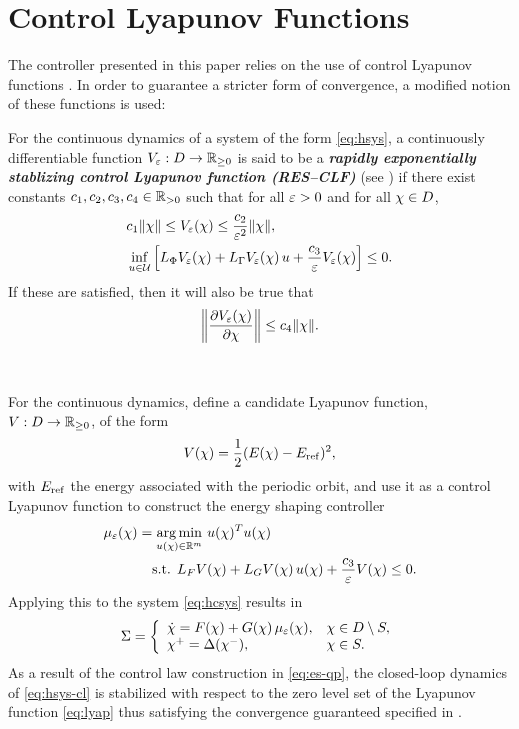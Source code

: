 \section{Control Lyapunov Functions}

The controller presented in this paper relies on the use of control Lyapunov functions \cite{Artstein83,FreeKoko}.
%
In order to guarantee a stricter form of convergence, a modified notion of these functions is used:\vgap

\begin{definition}
  \label{def:res-clf}
  For the continuous dynamics of a system of the form \eqref{eq:hsys}, a continuously differentiable function $V_{\varepsilon} : D \to \mathbb{R}_{\geq 0}$ is said to be a {\bf \em rapidly exponentially stablizing control Lyapunov function (RES--CLF)} (see \cite{AmGaSrGr14}) if there exist constants $c_{1}, c_{2}, c_{3}, c_{4} \in \mathbb{R}_{> 0}$ such that for all $\varepsilon > 0$ and for all $\chi \in D$,
  \begin{eqnarray}
    &c_{1} \|\chi\| \leq V_{\varepsilon}(\chi) \leq \frac{c_{2}}{\varepsilon^{2}} \|\chi\|,\\
    \nonumber
    &\inf_{u \in \mathcal{U}} \left[ L_{\Phi} V_{\varepsilon}(\chi) + L_{\Gamma} V_{\varepsilon}(\chi) \, u + \frac{c_{3}}{\varepsilon} V_{\varepsilon}(\chi) \right] \leq 0.
  \end{eqnarray}
  If these are satisfied, then it will also be true that
  \begin{align}
    \label{eq:dVedx-bounds}
    \left\| \frac{\partial{V_{\varepsilon}(\chi)}}{\partial{\chi}} \right\| \leq c_{4} \|\chi\|.
  \end{align}
\end{definition}

\


For the continuous dynamics, define a candidate Lyapunov function, $V : D \to \mathbb{R}_{\geq 0}$, of the form
%
\begin{align}
  \label{eq:lyap}
  V(\chi) = \frac{1}{2} (E(\chi) - E_{\mathrm{ref}})^2,
\end{align}
%
with $E_{\mathrm{ref}}$ the energy associated with the periodic orbit, and use it as a control Lyapunov function to construct the energy shaping controller
%
\begin{align}
  \label{eq:es-qp}
  \mu_{\varepsilon}(\chi) = \operatorname*{arg\,min}_{u(\chi) \in \mathbb{R}^{m}} \ & u(\chi)^T u(\chi)\\
  \nonumber
  \mbox{s.t. } L_{F} V&(\chi) + L_{G} V(\chi) \, u(\chi) + \frac{c_{3}}{\varepsilon} V(\chi) \leq 0.
\end{align}
%
Applying this to the system \eqref{eq:hcsys} results in
%
\begin{align}
  \label{eq:hsys-cl}
  \Sigma = \left\{
  \begin{array}{l l}
    {\dot {\chi}} = F(\chi) + G(\chi) \, \mu_{\varepsilon}(\chi), & \chi \in D \setminus S,\\
    \chi^{+} = \Delta(\chi^{-}), &\chi \in S.
  \end{array}\right.
\end{align}
%
As a result of the control law construction in \eqref{eq:es-qp}, the closed-loop dynamics of \eqref{eq:hsys-cl} is stabilized with respect to the zero level set of the Lyapunov function \eqref{eq:lyap} thus satisfying the convergence guaranteed specified in .

